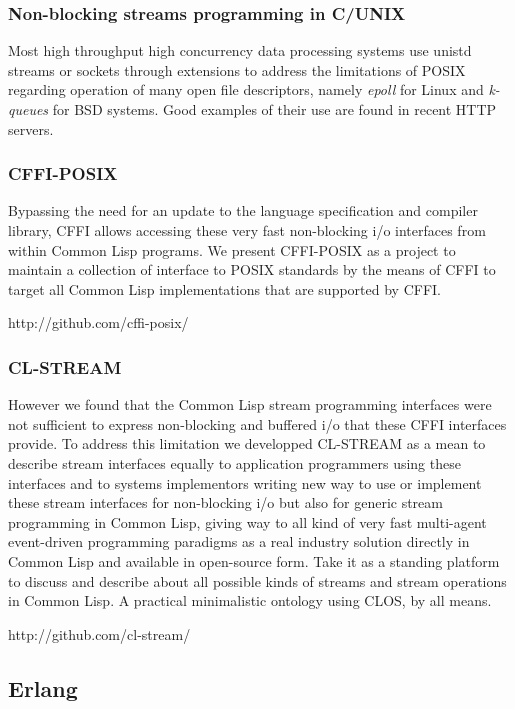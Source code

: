 \documentclass[sigconf]{acmart}
\begin{document}
\subsubsection{Non-blocking streams programming in C/UNIX}
Most high throughput high concurrency data processing systems use unistd streams or sockets through extensions to address the limitations of POSIX regarding operation of many open file descriptors, namely {\em epoll} for Linux and {\em k-queues} for BSD systems. Good examples of their use are found in recent HTTP servers.

\subsubsection{CFFI-POSIX}
Bypassing the need for an update to the language specification and compiler library, CFFI allows accessing these very fast non-blocking i/o interfaces from within Common Lisp programs. We present CFFI-POSIX as a project to maintain a collection of interface to POSIX standards by the means of CFFI to target all Common Lisp implementations that are supported by CFFI.

http://github.com/cffi-posix/

\subsubsection{CL-STREAM}
However we found that the Common Lisp stream programming interfaces were not sufficient to express non-blocking and buffered i/o that these CFFI interfaces provide. To address this limitation we developped CL-STREAM as a mean to describe stream interfaces equally to application programmers using these interfaces and to systems implementors writing new way to use or implement these stream interfaces for non-blocking i/o but also for generic stream programming in Common Lisp, giving way to all kind of very fast multi-agent event-driven programming paradigms as a real industry solution directly in Common Lisp and available in open-source form. Take it as a standing platform to discuss and describe about all possible kinds of streams and stream operations in Common Lisp. A practical minimalistic ontology using CLOS, by all means.

http://github.com/cl-stream/

\subsection{Erlang}
\end{document}
